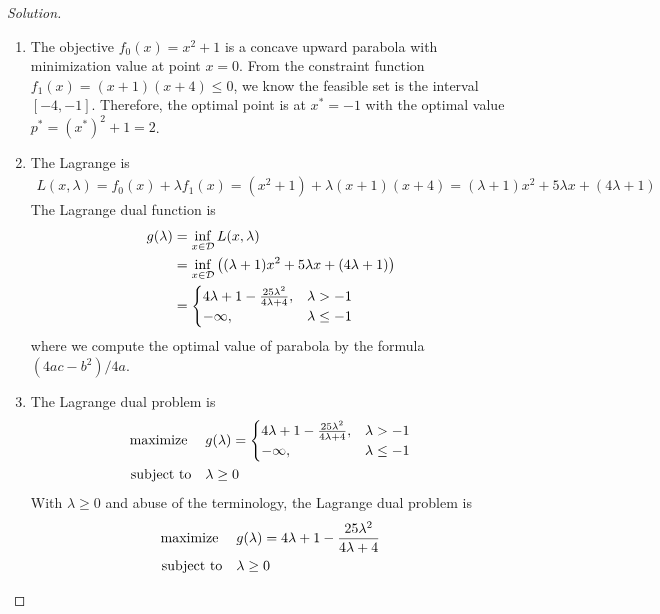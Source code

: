 \documentclass[12pt]{extarticle}
\theoremstyle{definition}
\begin{document}
\begin{proof}[Solution]
  \let\qed\relax
  $ $
  \begin{enumerate}[label=(\alph*)]
    \item The objective $f_0(x)=x^2+1$ is a concave upward parabola with minimization value at point $x=0$.
          From the constraint function $f_1(x)=(x+1)(x+4)\le 0$, we know the feasible set is the interval $[-4,-1]$.
          Therefore, the optimal point is at $x^\ast=-1$ with the optimal value $p^\ast=(x^\ast)^2+1=2$.
    \item The Lagrange is
          \begin{align*}
            L(x,\lambda)=f_0(x)+\lambda f_1(x)=(x^2+1)+\lambda(x+1)(x+4)=(\lambda+1)x^2+5\lambda x+(4\lambda+1)
          \end{align*}
          The Lagrange dual function is
          \begin{align*}
            g(\lambda)&=\inf_{x\in\mathcal{D}}L(x,\lambda)\\
                      &=\inf_{x\in\mathcal{D}}\left((\lambda+1)x^2+5\lambda x+(4\lambda+1)\right)\\
                      &=
              \begin{cases}
                4\lambda+1-\frac{25\lambda^2}{4\lambda+4}, &\lambda>-1\\
                -\infty, &\lambda\le -1
              \end{cases}
          \end{align*}
          where we compute the optimal value of parabola by the formula $(4ac-b^2)/4a$.
    \item The Lagrange dual problem is
          \begin{align*}
            \text{maximize\;}\quad& g(\lambda)=
              \begin{cases}
                4\lambda+1-\frac{25\lambda^2}{4\lambda+4}, &\lambda>-1\\
                -\infty, &\lambda\le -1
              \end{cases}\\
            \text{subject to}  \quad& \lambda\ge 0
          \end{align*}
          With $\lambda\ge 0$ and abuse of the terminology, the Lagrange dual problem is
          \begin{align*}
            \text{maximize\;}\quad& g(\lambda)=4\lambda+1-\frac{25\lambda^2}{4\lambda+4}\\
            \text{subject to}  \quad& \lambda\ge 0

\end{align*}
\end{enumerate}
\end{proof}
\end{document}

